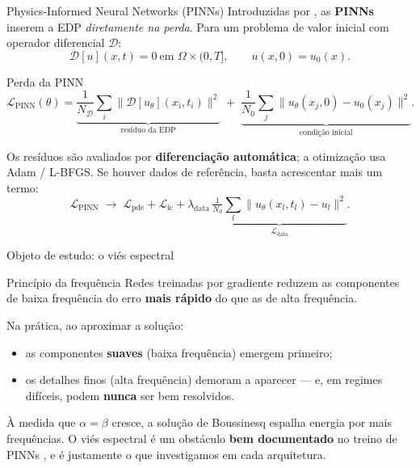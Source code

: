 \begin{frame}{Physics-Informed Neural Networks (PINNs)}
  Introduzidas por \textcite{raissi2017}, as \textbf{PINNs} inserem a EDP \emph{diretamente
  na perda}. Para um problema de valor inicial com operador diferencial $\mathcal{D}$:
  \begin{equation*}
    \mathcal{D}[u](x,t) = 0 \ \text{em } \Omega\times(0,T], \qquad u(x,0)=u_0(x).
  \end{equation*}
  \vspace{-0.45cm}
  \begin{block}{Perda da PINN}
    \begin{equation*}
      \mathcal{L}_{\text{PINN}}(\theta) =
      \underbrace{\frac{1}{N_\mathcal{D}}\sum_i \|\mathcal{D}[u_\theta](x_i,t_i)\|^2}_{\text{resíduo da EDP}}
      \;+\;
      \underbrace{\frac{1}{N_0}\sum_j \|u_\theta(x_j,0)-u_0(x_j)\|^2}_{\text{condição inicial}}.
    \end{equation*}
  \end{block}
  Os resíduos são avaliados por \textbf{diferenciação automática}; a otimização usa Adam /
  L-BFGS. Se houver dados de referência, basta acrescentar \alert{mais um termo}:
  \begin{equation*}
    \mathcal{L}_{\text{PINN}} \;\longrightarrow\;
    \mathcal{L}_{\text{pde}} + \mathcal{L}_{\text{ic}}
    + \lambda_{\text{data}}\,\underbrace{\tfrac{1}{N_d}\sum_l \|u_\theta(x_l,t_l)-u_l\|^2}_{\mathcal{L}_{\text{data}}}.
  \end{equation*}
\end{frame}

\begin{frame}{Objeto de estudo: o viés espectral}
  \begin{block}{Princípio da frequência \parencite{rahaman2019,xu2019frequency}}
    Redes treinadas por gradiente reduzem as componentes de \alert{baixa frequência} do erro
    \textbf{mais rápido} do que as de alta frequência.
  \end{block}

  Na prática, ao aproximar a solução:
  \begin{itemize}
    \item as componentes \textbf{suaves} (baixa frequência) emergem \alert{primeiro};
    \item os \alert{detalhes finos} (alta frequência) demoram a aparecer --- e, em regimes
          difíceis, podem \textbf{nunca} ser bem resolvidos.
  \end{itemize}
  \begin{information}
    À medida que $\alpha=\beta$ cresce, a solução de Boussinesq espalha energia por
    \alert{mais frequências}. O viés espectral é um obstáculo \textbf{bem documentado} no
    treino de PINNs \parencite{wang2022ntk}, e é justamente o que investigamos em cada
    arquitetura.
  \end{information}
\end{frame}

